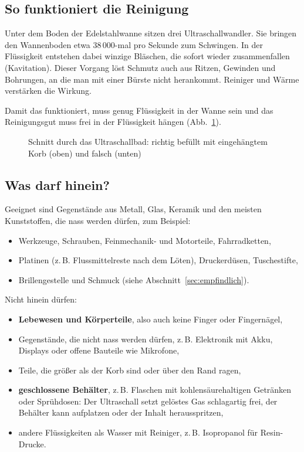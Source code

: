 \documentclass{\basedir/fablab-document}
\begin{document}
	\subsection{So funktioniert die Reinigung}

	Unter dem Boden der Edelstahlwanne sitzen drei Ultraschallwandler. Sie bringen den Wannenboden etwa 38\,000-mal pro Sekunde zum Schwingen. In der Flüssigkeit entstehen dabei winzige Bläschen, die sofort wieder zusammenfallen (Kavitation). Dieser Vorgang löst Schmutz auch aus Ritzen, Gewinden und Bohrungen, an die man mit einer Bürste nicht herankommt. Reiniger und Wärme verstärken die Wirkung.

	Damit das funktioniert, muss genug Flüssigkeit in der Wanne sein und das Reinigungsgut muss frei in der Flüssigkeit hängen (Abb.~\ref{abb:querschnitt}).

	\begin{figure}[H]
		\centering
		
		\caption{Schnitt durch das Ultraschallbad: richtig befüllt mit eingehängtem Korb (oben) und falsch (unten)}
		\label{abb:querschnitt}
	\end{figure}

	\subsection{Was darf hinein?}

	Geeignet sind Gegenstände aus Metall, Glas, Keramik und den meisten Kunststoffen, die nass werden dürfen, zum Beispiel:
	\begin{itemize}
		\item Werkzeuge, Schrauben, Feinmechanik- und Motorteile, Fahrradketten,
		\item Platinen (z.\,B. Flussmittelreste nach dem Löten), Druckerdüsen, Tuschestifte,
		\item Brillengestelle und Schmuck (siehe Abschnitt~\ref{sec:empfindlich}).
	\end{itemize}

	Nicht hinein dürfen:
	\begin{itemize}
		\item \textbf{Lebewesen und Körperteile}, also auch keine Finger oder Fingernägel,
		\item Gegenstände, die nicht nass werden dürfen, z.\,B. Elektronik mit Akku, Displays oder offene Bauteile wie Mikrofone,
		\item Teile, die größer als der Korb sind oder über den Rand ragen,
		\item \textbf{geschlossene Behälter}, z.\,B. Flaschen mit kohlensäurehaltigen Getränken oder Sprühdosen: Der Ultraschall setzt gelöstes Gas schlagartig frei, der Behälter kann aufplatzen oder der Inhalt herausspritzen,
		\item andere Flüssigkeiten als Wasser mit Reiniger, z.\,B. Isopropanol für Resin-Drucke.
	\end{itemize}
\end{document}

